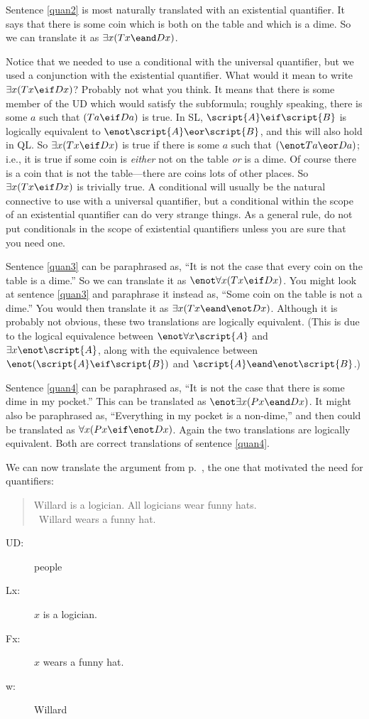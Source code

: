 Sentence \ref{quan2} is most naturally translated with an existential quantifier. It says that there is some coin which is both on the table and which is a dime. So we can translate it as $\exists x(Tx \eand Dx)$.

Notice that we needed to use a conditional with the universal quantifier, but we used a conjunction with the existential quantifier. What would it mean to write $\exists x(Tx \eif Dx)$? Probably not what you think. It means that there is some member of the UD which would satisfy the subformula; roughly speaking, there is some $a$ such that $(Ta \eif Da)$ is true. In SL, $\script{A} \eif \script{B}$ is logically equivalent to $\enot\script{A} \eor \script{B}$, and this will also hold in QL. So $\exists x(Tx \eif Dx)$ is true if there is some $a$ such that $(\enot Ta \eor Da)$; i.e., it is true if some coin is \emph{either} not on the table \emph{or} is a dime. Of course there is a coin that is not the table---there are coins lots of other places. So $\exists x(Tx \eif Dx)$ is trivially true. A conditional will usually be the natural connective to use with a universal quantifier, but a conditional within the scope of an existential quantifier can do very strange things. As a general rule, do not put conditionals in the scope of existential quantifiers unless you are sure that you need one.

Sentence \ref{quan3} can be paraphrased as, ``It is not the case that every coin on the table is a dime.'' So we can translate it as $\enot \forall x(Tx \eif Dx)$. You might look at sentence \ref{quan3} and paraphrase it instead as, ``Some coin on the table is not a dime.'' You would then translate it as $\exists x(Tx \eand \enot Dx)$. Although it is probably not obvious, these two translations are logically equivalent. (This is due to the logical equivalence between $\enot\forall x\script{A}$ and $\exists x\enot\script{A}$, along with the equivalence between $\enot(\script{A}\eif\script{B})$ and $\script{A}\eand\enot\script{B}$.)

Sentence \ref{quan4} can be paraphrased as, ``It is not the case that there is some dime in my pocket.'' This can be translated as $\enot\exists x(Px \eand Dx)$. It might also be paraphrased as, ``Everything in my pocket is a non-dime,'' and then could be translated as $\forall x(Px \eif \enot Dx)$. Again the two translations are logically equivalent. Both are correct translations of sentence \ref{quan4}.

We can now translate the argument from p.~\pageref{willard1}, the one that motivated the need for quantifiers:
\begin{quote}
Willard is a logician. All logicians wear funny hats.\\
\therefore\ Willard wears a funny hat.
\end{quote}
\begin{description}
\item[UD:] people
\item[Lx:] $x$ is a logician.
\item[Fx:] $x$ wears a funny hat.
\item[w:] Willard
\end{description}

